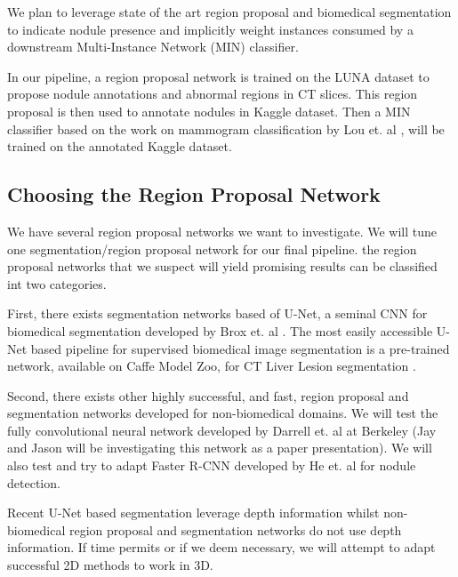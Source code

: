 \documentclass[twocolumn,10pt]{article}
\begin{document}
We plan to leverage state of the art region proposal and biomedical segmentation
to indicate nodule presence and implicitly weight instances consumed by a 
downstream Multi-Instance Network (MIN) classifier.

In our pipeline, a region proposal network is trained on the LUNA dataset to propose
nodule annotations and abnormal regions in CT slices. This region proposal 
is then used to annotate nodules in Kaggle dataset. Then a MIN classifier based 
on the work on mammogram  classification by Lou et. al \cite{DBLP:journals/corr/ZhuLVX16},
will be trained on the annotated Kaggle dataset.

\subsection{Choosing the Region Proposal Network}
We have several region proposal networks we want to investigate.
We will tune one segmentation/region proposal network for our final pipeline. 
the region proposal networks that we suspect will yield promising results can 
be classified int two categories.

First, there exists segmentation networks based of U-Net, a seminal CNN for biomedical
segmentation developed by Brox et. al \cite{U-net_2015}. The most easily accessible
U-Net based pipeline for supervised biomedical image segmentation is 
a pre-trained network, available on Caffe Model Zoo, for CT Liver Lesion 
segmentation \cite{DBLP:journals/corr/ChristEETBBRAHD16}.

Second, there exists other highly successful, and fast, region proposal and 
segmentation networks developed for non-biomedical domains. We
will test the fully convolutional neural network developed by Darrell et. al at
Berkeley \cite{long_shelhamer_fcn} (Jay and Jason will be investigating this network as a paper 
presentation). We will also test and try to adapt Faster R-CNN developed by He 
et. al \cite{fast_rcnn_2015, faster_rcnn_2015} for nodule detection.

Recent U-Net based segmentation leverage depth information whilst non-biomedical
region proposal and segmentation networks do not use depth information. If time permits or
if we deem necessary, we will attempt to adapt successful 2D methods to work in 3D. 


\end{document}
